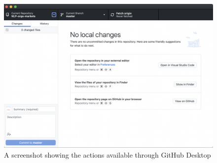 \documentclass[a4paper,11pt]{book}
\begin{document}
\begin{appendices}
\begin{figure}[!htbp]
	\includegraphics[width=1\textwidth]{github_options}
	\caption{A screenshot showing the actions available through GitHub Desktop}
	\label{fig:github_options}
\end{figure}

\clearpage

\theendnotes

\end{appendices}
\end{document}
